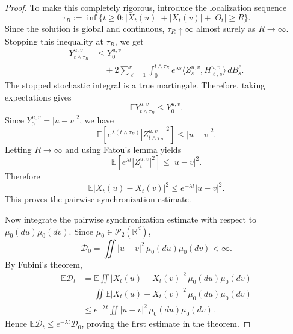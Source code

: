 \documentclass{tsp-short}
\theoremstyle{remark}
\theoremstyle{definition}
\newcommand{\R}{\mathbb{R}} %
\newcommand{\cP}{\mathcal{P}} %
\newcommand{\E}{\mathbb E} %
\begin{document}
\begin{proof}
	To make this completely rigorous, introduce the localization sequence
	\begin{equation*}
		\tau_R := \inf\{t\ge0: |X_t(u)|+|X_t(v)|+|\Theta_t|\ge R\}.
	\end{equation*}
	Since the solution is global and continuous, \(\tau_R\uparrow\infty\) almost surely as \(R\to\infty\). Stopping this inequality at
	\(\tau_R\), we get
	\begin{align*}
		Y_{t\wedge\tau_R}^{u,v} & \le Y_0^{u,v}                                                                                                       \\
		                        & \quad + 2\sum_{\ell=1}^r \int_0^{t\wedge\tau_R} e^{\lambda s} \langle Z_s^{u,v},H_{\ell,s}^{u,v}\rangle\,dB_s^\ell.
	\end{align*}
	The stopped stochastic integral is a true martingale. Therefore, taking
	expectations gives
	\begin{equation*}
		\E Y_{t\wedge\tau_R}^{u,v} \le Y_0^{u,v}.
	\end{equation*}
	Since \(Y_0^{u,v}=|u-v|^2\), we have
	\begin{equation*}
		\E\left[ e^{\lambda(t\wedge\tau_R)} |Z_{t\wedge\tau_R}^{u,v}|^2 \right] \le |u-v|^2.
	\end{equation*}
	Letting \(R\to\infty\) and using Fatou's lemma yields
	\begin{equation*}
		\E\left[e^{\lambda t}|Z_t^{u,v}|^2\right] \le |u-v|^2.
	\end{equation*}
	Therefore
	\begin{equation*}
		\E|X_t(u)-X_t(v)|^2 \le  e^{-\lambda t}|u-v|^2.
	\end{equation*}
	This proves the pairwise synchronization estimate.

	Now integrate the pairwise synchronization estimate with respect to \(\mu_0(du)\mu_0(dv)\). Since \(\mu_0\in\cP_2(\R^d)\),
	\begin{equation*}
		\mathcal D_0 = \iint |u-v|^2\,\mu_0(du)\mu_0(dv)<\infty.
	\end{equation*}
	By Fubini's theorem,
	\begin{align*}
		\E\mathcal D_t & = \E \iint |X_t(u)-X_t(v)|^2\,\mu_0(du)\mu_0(dv)      \\
		               & = \iint \E|X_t(u)-X_t(v)|^2\,\mu_0(du)\mu_0(dv)       \\
		               & \le e^{-\lambda t} \iint |u-v|^2\,\mu_0(du)\mu_0(dv).
	\end{align*}
	Hence \(\E\mathcal D_t\le e^{-\lambda t}\mathcal D_0\), proving
	the first estimate in the theorem.


\end{proof}
\end{document}
